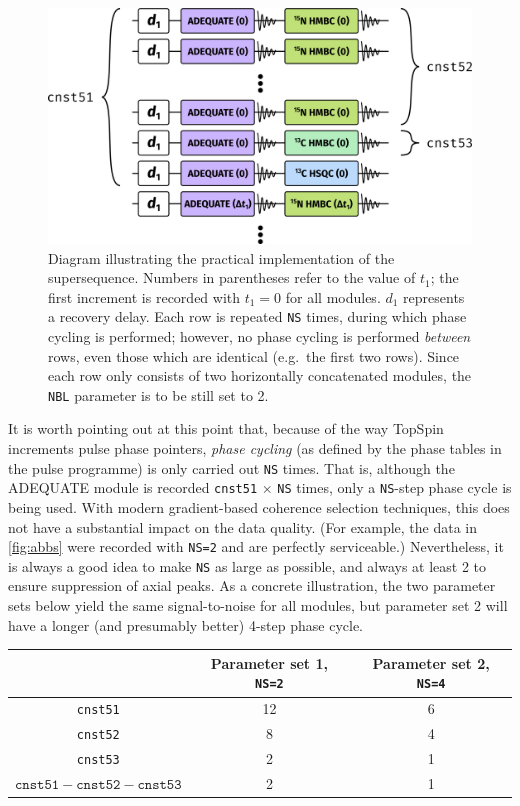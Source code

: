 \documentclass[a4paper,12pt]{article}
\begin{document}
\begin{refsection}
\begin{figure}[!ht]
    \centering
    \includegraphics[scale=1.2]{figures/abbs_pp.png}%
    \caption[]{
        Diagram illustrating the practical implementation of the  supersequence.
        Numbers in parentheses refer to the value of $t_1$; the first increment is recorded with $t_1 = 0$ for all modules.
        $d_1$ represents a recovery delay.
        Each row is repeated \texttt{NS} times, during which phase cycling is performed; however, no phase cycling is performed \textit{between} rows, even those which are identical (e.g.\ the first two rows).
        Since each row only consists of two horizontally concatenated modules, the \texttt{NBL} parameter is to be still set to 2.
    }
    \label{fig:}
\end{figure}

It is worth pointing out at this point that, because of the way TopSpin increments pulse phase pointers, \textit{phase cycling} (as defined by the phase tables in the pulse programme) is only carried out \texttt{NS} times.
That is, although the ADEQUATE module is recorded \texttt{cnst51} $\times$ \texttt{NS} times, only a \texttt{NS}-step phase cycle is being used.
With modern gradient-based coherence selection techniques, this does not have a substantial impact on the data quality.
(For example, the data in \cref{fig:abbs} were recorded with \texttt{NS=2} and are perfectly serviceable.)
Nevertheless, it is always a good idea to make \texttt{NS} as large as possible, and always at least 2 to ensure suppression of axial peaks.
As a concrete illustration, the two parameter sets below yield the same signal-to-noise for all modules, but parameter set 2 will have a longer (and presumably better) 4-step phase cycle.

\begin{table}[H]
    \centering
    \begin{tabular}{ccc}
        \toprule
         & Parameter set 1, \texttt{NS=2} & Parameter set 2, \texttt{NS=4} \\
        \midrule
        \texttt{cnst51} & 12 & 6 \\
        \texttt{cnst52} & 8  & 4 \\
        \texttt{cnst53} & 2  & 1 \\
        $\texttt{cnst51} - \texttt{cnst52} - \texttt{cnst53}$ & 2  & 1 \\
        \bottomrule
    \end{tabular}
\end{table}


\end{refsection}
\end{document}
